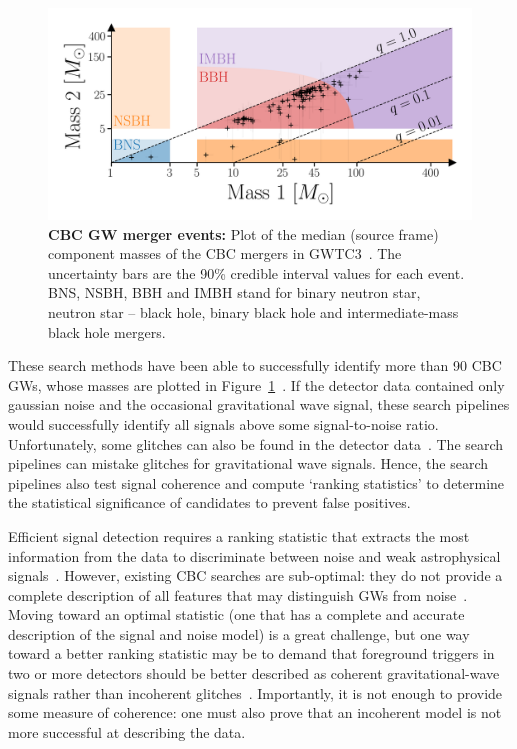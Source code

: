 \begin{figure}
\begin{center}
  \centerline{\includegraphics[width=1.1\linewidth]{src/figures/gw_catalog.png}}
  \caption{\textbf{CBC GW merger events:} Plot of the median (source frame) component masses of the CBC mergers in GWTC3~\cite{gwtc3}. The uncertainty bars are the 90\% credible interval values for each event. BNS, NSBH, BBH and IMBH stand for binary neutron star, neutron star -- black hole, binary black hole and intermediate-mass black hole mergers. }
  \label{fig:cbc_mergers}
\end{center}
\end{figure}

These search methods have been able to successfully identify more than 90 CBC GWs, whose masses are plotted in Figure~\ref{fig:cbc_mergers}~\cite{gwtc3}.
If the detector data contained only gaussian noise and the occasional gravitational wave signal, these search pipelines would successfully identify all signals above some signal-to-noise ratio. 
Unfortunately, some glitches can also be found in the detector data~\cite{gw_search_review}. 
The search pipelines can mistake glitches for gravitational wave signals. 
Hence, the search pipelines also test signal coherence and compute `ranking statistics' to determine the statistical significance of candidates to prevent false positives. 

Efficient signal detection requires a ranking statistic that extracts the most information from the data to discriminate between noise and weak astrophysical signals~\cite{bci, bayeswave_as_followup, bcr_paper, bootstrap_gw, bcr_gw151216,bcr_gw151216, bayesian_odds}.  
However, existing CBC searches are sub-optimal: they do not provide a complete description of all features that may distinguish GWs from noise~\cite{bci}. 
Moving toward an optimal statistic (one that has a complete and accurate description of the signal and noise model) is a great challenge, but one way toward a better ranking statistic may be to demand that foreground triggers in two or more detectors should be better described as coherent gravitational-wave signals rather than incoherent glitches~\cite{bci}.
Importantly, it is not enough to provide some measure of coherence: one must also prove that an incoherent model is not more successful at describing the data. 

